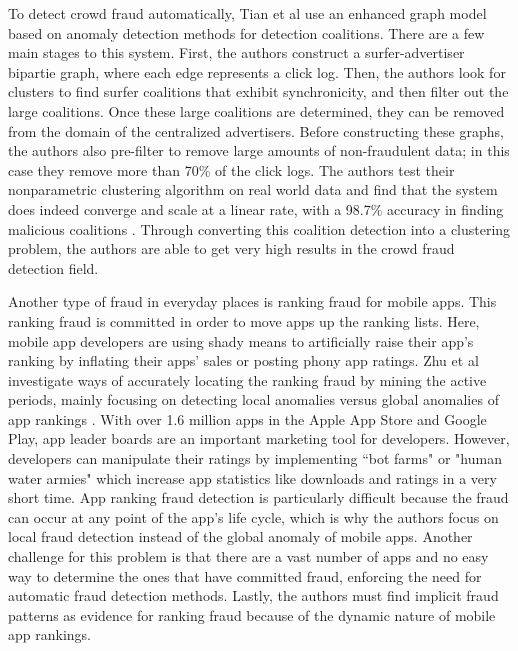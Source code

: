 \documentclass[midd]{thesis}
\begin{document}
To detect crowd fraud automatically, Tian et al use an enhanced graph model based on anomaly detection methods for detection coalitions. There are a few main stages to this system. First, the authors construct a surfer-advertiser bipartie graph, where each edge represents a click log. Then, the authors look for clusters to find surfer coalitions that exhibit synchronicity, and then filter out the large coalitions. Once these large coalitions are determined, they can be removed from the domain of the centralized advertisers. Before constructing these graphs, the authors also pre-filter to remove large amounts of non-fraudulent data; in this case they remove more than 70\% of the click logs. The authors test their nonparametric clustering algorithm on real world data and find that the system does indeed converge and scale at a linear rate, with a 98.7\% accuracy in finding malicious coalitions \cite{Tian}. Through converting this coalition detection into a clustering problem, the authors are able to get very high results in the crowd fraud detection field. 

Another type of fraud in everyday places is ranking fraud for mobile apps. This ranking fraud is committed in order to move apps up the ranking lists. Here, mobile app developers are using shady means to artificially raise their app's ranking by inflating their apps' sales or posting phony app ratings. Zhu et al investigate ways of accurately locating the ranking fraud by mining the active periods, mainly focusing on detecting local anomalies versus global anomalies of app rankings \cite{Zhu2015}. With over 1.6 million apps in the Apple App Store and Google Play, app leader boards are an important marketing tool for developers. However, developers can manipulate their ratings by implementing ``bot farms" or "human water armies" which increase app statistics like downloads and ratings in a very short time. App ranking fraud detection is particularly difficult because the fraud can occur at any point of the app's life cycle, which is why the authors focus on local fraud detection instead of the global anomaly of mobile apps. Another challenge for this problem is that there are a vast number of apps and no easy way to determine the ones that have committed fraud, enforcing the need for automatic fraud detection methods. Lastly, the authors must find implicit fraud patterns as evidence for ranking fraud because of the dynamic nature of mobile app rankings.
\end{document}
